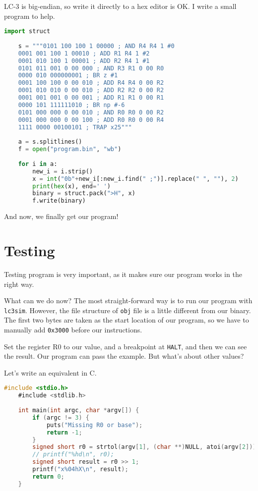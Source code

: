 \documentclass{article}
\begin{document}
	LC-3 is big-endian, so write it directly to a hex editor is OK. I write a small program to help.
	
	\begin{lstlisting}[language=Python, caption={The convertion program},captionpos=b]
	import struct
	
	s = """0101 100 100 1 00000 ; AND R4 R4 1 #0
	0001 001 100 1 00010 ; ADD R1 R4 1 #2
	0001 010 100 1 00001 ; ADD R2 R4 1 #1
	0101 011 001 0 00 000 ; AND R3 R1 0 00 R0
	0000 010 000000001 ; BR z #1
	0001 100 100 0 00 010 ; ADD R4 R4 0 00 R2
	0001 010 010 0 00 010 ; ADD R2 R2 0 00 R2
	0001 001 001 0 00 001 ; ADD R1 R1 0 00 R1
	0000 101 111111010 ; BR np #-6
	0101 000 000 0 00 010 ; AND R0 R0 0 00 R2
	0001 000 000 0 00 100 ; ADD R0 R0 0 00 R4
	1111 0000 00100101 ; TRAP x25"""
	
	a = s.splitlines()
	f = open("program.bin", "wb")
	
	for i in a:
		new_i = i.strip()
		x = int("0b"+new_i[:new_i.find(" ;")].replace(" ", ""), 2)
		print(hex(x), end=' ')
		binary = struct.pack(">H", x)
		f.write(binary)
	\end{lstlisting}
	
	And now, we finally get our program!
	
	\section{Testing}
	\label{sec:testing}
	
	Testing program is very important, as it makes sure our program works in the right way.
	
	What can we do now? The most straight-forward way is to run our program with \texttt{lc3sim}. However, the file structure of \texttt{obj} file is a little different from our binary. The first two bytes are taken as the start location of our program, so we have to manually add \texttt{0x3000} before our instructions.
	
	Set the register R0 to our value, and a breakpoint at \texttt{HALT}, and then we can see the result. Our program can pass the example. But what's about other values?
	
	Let's write an equivalent in C.
	
	\begin{lstlisting}[language=C, caption={The C program, which does the same task},captionpos=b]
	#include <stdio.h>
	#include <stdlib.h>
	
	int main(int argc, char *argv[]) {
		if (argc != 3) {
			puts("Missing R0 or base");
			return -1;
		}
		signed short r0 = strtol(argv[1], (char **)NULL, atoi(argv[2]));
		// printf("%hd\n", r0);
		signed short result = r0 >> 1;
		printf("x%04hX\n", result);
		return 0;
	}
	
	\end{lstlisting}
	
\end{document}
